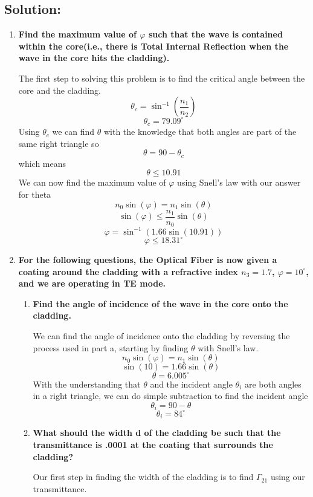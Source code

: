 \documentclass{article}
\begin{document}
\subsection{Solution:}
\begin{enumerate}[label=(\alph*)]
    \item \textbf{Find the maximum value of $\varphi$ such that the wave is contained within the core(i.e., there is Total Internal Reflection when the wave in the core hits the cladding).}
    
    The first step to solving this problem is to find the critical angle between the core and the cladding. 
    $$\theta_{c} = \sin^{-1}(\frac{n_{1}}{n_{2}})$$
    $$\theta_{c} = 79.09^{\circ}$$
    Using $\theta_{c}$ we can find $\theta$ with the knowledge that both angles are part of the same right triangle so 
    $$\theta = 90 - \theta_{c}$$
    which means 
    $$\theta \le 10.91$$
    We can now find the maximum value of $\varphi$ using Snell's law with our answer for theta
    $$n_{0}\sin(\varphi) = n_{1}\sin(\theta)$$
    $$\sin(\varphi) \le \frac{n_{1}}{n_{0}}\sin(\theta)$$
    $$\varphi = \sin^{-1}(1.66\sin(10.91))$$
    $$\boxed{\varphi \le 18.31^{\circ}}$$
    
    \item \textbf{For the following questions, the Optical Fiber is now given a coating around the cladding with a refractive index $n_{3}=1.7$, $\varphi=10^{\circ}$, and we are operating in TE mode.}
    \begin{enumerate}[label=(\roman*)]
        \item \textbf{Find the angle of incidence of the wave in the core onto the cladding.}

    We can find the angle of incidence onto the cladding by reversing the process used in part a, starting by finding $\theta$ with Snell's law.
    $$n_{0}\sin(\varphi) = n_{1}\sin(\theta)$$
    $$\sin(10) = 1.66\sin(\theta)$$
    $$\theta = 6.005^{\circ}$$
    With the understanding that $\theta$ and the incident angle $\theta_{i}$ are both angles in a right triangle, we can do simple subtraction to find the incident angle
    $$\theta_{i} = 90 - \theta$$
    $$\boxed{\theta_{i} = 84^{\circ}}$$
        \item \textbf{ What should the width d of the cladding be such that the transmittance is .0001 at the coating that surrounds the cladding?}
        
    Our first step in finding the width of the cladding is to find $\Gamma_{21}$ using our transmittance.
    

\end{enumerate}
\end{enumerate}
\end{document}

